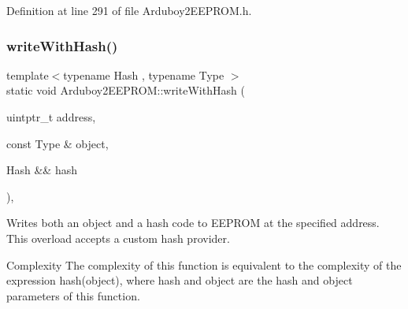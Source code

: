 Definition at line 291 of file Arduboy2\+E\+E\+P\+R\+O\+M.\+h.

\mbox{\label{classArduboy2EEPROM_a40f0abec863d2772e8da19d3cf37e980}} 
\subsubsection{\texorpdfstring{writeWithHash()}{writeWithHash()}\hspace{0.1cm}{\footnotesize\ttfamily [2/2]}}
{\footnotesize\ttfamily template$<$typename Hash , typename Type $>$ \\
static void Arduboy2\+E\+E\+P\+R\+O\+M\+::write\+With\+Hash (\begin{DoxyParamCaption}\item[{uintptr\+\_\+t}]{address,  }\item[{const Type \&}]{object,  }\item[{Hash \&\&}]{hash }\end{DoxyParamCaption})\hspace{0.3cm}{\ttfamily [inline]}, {\ttfamily [static]}}



Writes both an object and a hash code to E\+E\+P\+R\+OM at the specified address. This overload accepts a custom hash provider. 

\begin{DoxyParagraph}{Complexity}
The complexity of this function is equivalent to the complexity of the expression {\ttfamily hash(object)}, where {\ttfamily hash} and {\ttfamily object} are the {\ttfamily hash} and {\ttfamily object} parameters of this function.
\end{DoxyParagraph}

